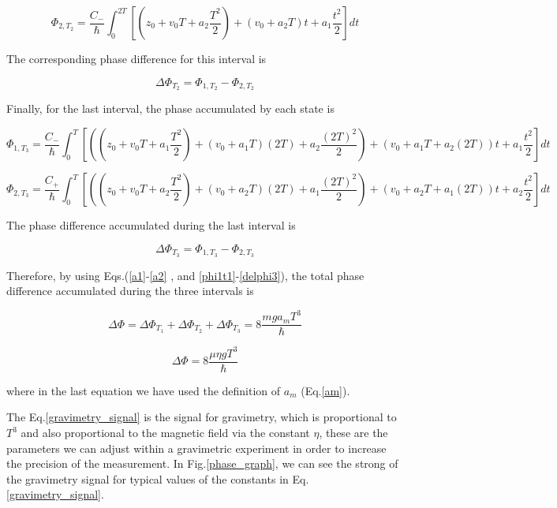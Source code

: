 \documentclass{article}
\begin{document}
\begin{equation}
\Phi_{2, T_{2}} = \frac{C_{-}}{\hbar} \int_{0}^{2T} [(z_{0}+v_{0}T+a_{2} \frac{T^{2}}{2}) + (v_{0}+a_{2}T)t + a_{1} \frac{t^{2}}{2}]dt
\end{equation}

The corresponding phase difference for this interval is

\begin{equation}
\Delta \Phi_{T_{2}} = \Phi_{1, T_{2}} - \Phi_{2, T_{2}}
\end{equation}

Finally, for the last interval, the phase accumulated by each state is

\begin{equation}
\Phi_{1, T_{3}} = \frac{C_{-}}{\hbar} \int_{0}^{T} [((z_{0}+v_{0}T+a_{1} \frac{T^{2}}{2}) + (v_{0}+a_{1}T)(2T) + a_{2} \frac{(2T)^{2}}{2}) + (v_{0}+a_{1}T + a_{2}(2T))t + a_{1} \frac{t^{2}}{2}]dt
\end{equation}

\begin{equation}
\Phi_{2, T_{3}} = \frac{C_{+}}{\hbar} \int_{0}^{T} [((z_{0}+v_{0}T+a_{2} \frac{T^{2}}{2}) + (v_{0}+a_{2}T)(2T) + a_{1} \frac{(2T)^{2}}{2}) + (v_{0}+a_{2}T + a_{1}(2T))t + a_{2} \frac{t^{2}}{2}]dt
\end{equation}

The phase difference accumulated during the last interval is

\begin{equation}\label{delphi3}
\Delta \Phi_{T_{3}} = \Phi_{1, T_{3}} - \Phi_{2, T_{3}}
\end{equation}

Therefore, by using Eqs.(\ref{a1}-\ref{a2} , and \ref{phi1t1}-\ref{delphi3}), the total phase difference accumulated during the three intervals is

\begin{equation}
\Delta \Phi = \Delta \Phi_{T_{1}} + \Delta \Phi_{T_{2}} + \Delta \Phi_{T_{3}} = 8 \frac{mga_{m}T^3}{\hbar}
\end{equation}

\begin{equation}\label{gravimetry_signal}
\Delta \Phi = 8 \frac{\mu \eta g T^3}{\hbar}
\end{equation}

where in the last equation we have used the definition of $a_m$ (Eq.\ref{am}). 

The Eq.\ref{gravimetry_signal} is the signal for gravimetry, which is proportional to $T^3$ and also proportional to the magnetic field via the constant $\eta$, these are the parameters we can adjust within a gravimetric experiment in order to increase the precision of the measurement. In Fig.\ref{phase_graph}, we can see the strong of the gravimetry signal for typical values of the constants in Eq.\ref{gravimetry_signal}.
\end{document}
